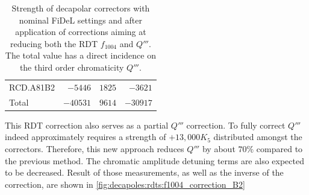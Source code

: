 \begin{table}[!htb]
\begin{tabular}{lrrr}
    \hspace{2mm}RCD.A81B2 &$-5446$ & $1825 $ &  $-3621 $\\
    \hspace{2mm}Total     &$-40531$& $9614 $ &  $-30917$      \\
    \bottomrule
    \end{tabular}
    \caption{Strength of decapolar correctors with nominal FiDeL settings and after application of
    corrections aiming at reducing both the RDT $f_{1004}$ and $Q'''$. The total value has a direct
    incidence on the third order chromaticity $Q'''$.}
    \label{tab:decapoles:rdts:correction_f1004_k5}
\end{table}

This RDT correction also serves as a partial $Q'''$ correction. To fully correct $Q'''$ indeed
approximately requires a strength of $+13,000 K_5$ distributed amongst the correctors. Therefore,
this new approach reduces $Q'''$ by about $70\%$ compared to the previous method. The chromatic
amplitude detuning terms are also expected to be decreased.
Result of those measurements, as well as the inverse of the correction, are shown in 
\cref{fig:decapoles:rdts:f1004_correction_B2}

